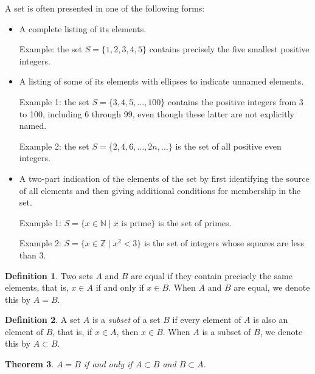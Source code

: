 \documentclass[12pt]{article}
\newtheorem{theorem}{Theorem}[section]
\theoremstyle{definition}
\newtheorem{definition}[theorem]{Definition}
\numberwithin{equation}{subsection}
\begin{document}

A set is often presented in one of the following forms:
\begin{itemize}
\item
A complete listing of its elements.

Example:  the set $S=\{1,2,3,4,5\}$ contains precisely the 
five smallest positive integers.

\item
A listing of some of its elements with ellipses to indicate unnamed elements.

Example 1:  the set $S=\{3, 4, 5, \ldots, 100\}$ contains the positive integers from 3 to 100,
including 6 through 99, even though these latter are not explicitly named.  

Example 2:  the set $S=\{2, 4, 6, \ldots, 2n, \ldots \}$ is the set of all positive even integers.

\item
A two-part indication of the elements of the set by first identifying the source of all elements
and then giving additional conditions for membership in the set.

Example 1: 
$S=\{x\in {\mathbb N}\mid \mbox{$x$ is prime}\}$ is the set of primes.  

Example 2:
$S=\{x\in {\mathbb Z}\mid \mbox{$x^2<3$}\}$ is the set of integers whose squares are less than 3.
\end{itemize}

\begin{definition}  
Two sets $A$ and $B$ are equal if they contain precisely the same elements, that is, $x\in A$
if and only if $x\in B$.  When $A$ and $B$ are equal, we denote this by $A=B$.
\end{definition}

\begin{definition}  
A set $A$ is a {\em subset} of a set $B$ if every element of $A$ is also an element of $B$, that is,
if $x\in A$, then $x\in B$.  When $A$ is a subset of $B$, we denote this by $A\subset B$.
\end{definition}

\begin{theorem}
$A=B$ if and only if $A\subset B$ and $B\subset A$.
\end{theorem}
\end{document}
